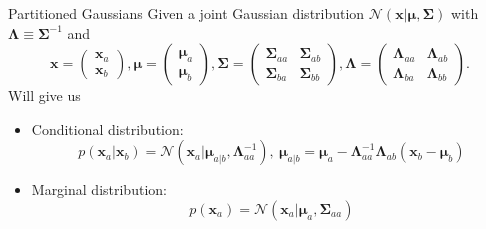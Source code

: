  \begin{frame}{\insertsubsection}
 
 \begin{block}{Partitioned Gaussians}
 Given a joint Gaussian distribution $\mathcal{N}(\mathbf{x} | \boldsymbol{\mu}, \boldsymbol{\Sigma})$ with $\boldsymbol{\Lambda} \equiv \boldsymbol{\Sigma}^{-1}$ and
 \begin{equation*}
 	\mathbf{x} = 
 	 \begin{pmatrix}
 		\mathbf{x} _{a} \\
 		\mathbf{x} _{b}
 	\end{pmatrix} , 
 	\boldsymbol{\mu} = 
 	 \begin{pmatrix}
 		\boldsymbol{\mu}_{a} \\
 		\boldsymbol{\mu}_{b}
 	\end{pmatrix} , 
 	 \boldsymbol{\Sigma} = 
 	 \begin{pmatrix}
 		\boldsymbol{\Sigma}_{aa} & \boldsymbol{\Sigma}_{ab} \\
 		\boldsymbol{\Sigma}_{ba} & \boldsymbol{\Sigma}_{bb} 
 	\end{pmatrix} ,  \boldsymbol{\Lambda} = 
 	 \begin{pmatrix}
 		\boldsymbol{\Lambda}_{aa} & \boldsymbol{\Lambda}_{ab} \\
 		\boldsymbol{\Lambda}_{ba} & \boldsymbol{\Lambda}_{bb} 
 	\end{pmatrix}.
 \end{equation*}
 Will give us \\
 \begin{itemize}
 \item \textcolor{UniGold}{Conditional distribution:}
 \begin{equation*}
 p\left( \mathbf{x}_a | \mathbf{x}_b \right) = \mathcal{N}\left( \mathbf{x}_a| \boldsymbol{\mu}_{a|b}, \boldsymbol{\Lambda}^{-1}_{aa} \right), \  \boldsymbol{\mu}_{a|b} =  \boldsymbol{\mu}_a - \boldsymbol{\Lambda}^{-1}_{aa}\boldsymbol{\Lambda}_{ab} \left( \mathbf{x}_b - \boldsymbol{\mu}_b \right)
 \end{equation*}

 \item \textcolor{UniGold}{Marginal distribution:}
 \begin{equation*}
 p\left( \mathbf{x}_a \right) = \mathcal{N} \left( \mathbf{x}_a | \boldsymbol{\mu}_a,\boldsymbol{\Sigma}_{aa} \right)
 \end{equation*}
 \end{itemize}

 \end{block}
 \end{frame}


